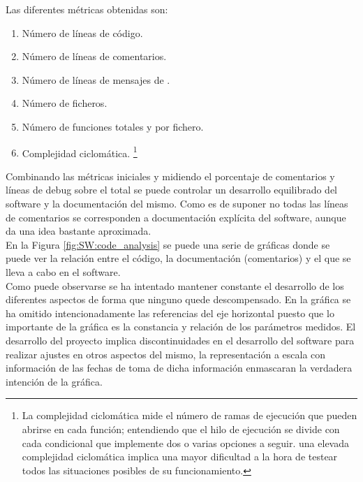     Las diferentes métricas obtenidas son:

    \begin{enumerate}
        \item Número de líneas de código.
        \item Número de líneas de comentarios.
        \item Número de líneas de mensajes de .
        \item Número de ficheros.
        \item Número de funciones totales y por fichero.
        \item Complejidad ciclomática. \footnote{La complejidad ciclomática mide el número de ramas de ejecución que pueden abrirse en cada función; entendiendo que el hilo de ejecución se divide con cada condicional que implemente dos o varias opciones a seguir. una elevada complejidad ciclomática implica una mayor dificultad a la hora de testear todos las situaciones posibles de su funcionamiento.}
    \end{enumerate}

    Combinando las métricas iniciales y midiendo el porcentaje de comentarios y líneas de debug sobre el total se puede controlar un desarrollo equilibrado del software y la documentación del mismo. Como es de suponer no todas las líneas de comentarios se corresponden a documentación explícita del software, aunque da una idea bastante aproximada. 
    \\
    
    En la Figura \ref{fig:SW:code_analysis} se puede una serie de gráficas donde se puede ver la relación entre el código, la documentación (comentarios) y el  que se lleva a cabo en el software.
    \\
    
    Como puede observarse se ha intentado mantener constante el desarrollo de los diferentes aspectos de forma que ninguno quede descompensado. En la gráfica se ha omitido intencionadamente las referencias del eje horizontal puesto que lo importante de la gráfica es la constancia y relación de los parámetros medidos. El desarrollo del proyecto implica discontinuidades en el desarrollo del software para realizar ajustes en otros aspectos del mismo, la representación a escala con información de las fechas de toma de dicha información enmascaran la verdadera intención de la gráfica.

